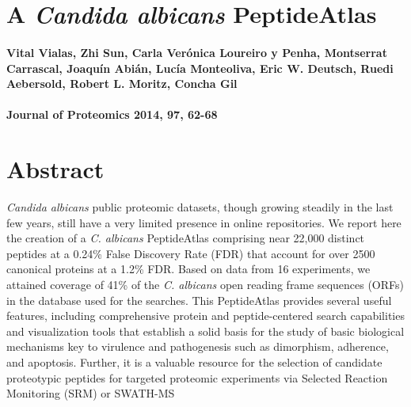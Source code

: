 %
%


\chapter*{A \textit{\textit{Candida albicans}} PeptideAtlas}


\renewcommand{\headrulewidth}{0pt}

\subsubsection*{Vital Vialas, Zhi Sun, Carla Ver\'onica Loureiro y Penha, Montserrat Carrascal, Joaqu\'in Abi\'an, Luc\'ia Monteoliva, Eric W. Deutsch, Ruedi Aebersold, Robert L. Moritz, Concha Gil}
\subsubsection*{Journal of Proteomics 2014, 97, 62-68}

\newpage


%
%



\chapter*{Abstract}
\textit{Candida albicans} public proteomic datasets, though growing
 steadily in the last few years, still have a very limited presence in
 online repositories. We report here the creation of a \textit{C. albicans} PeptideAtlas
 comprising near 22,000 distinct peptides at a 0.24\% False Discovery
 Rate (FDR) that account for over 2500 canonical proteins at a 1.2\% FDR.
 Based on data from 16 experiments, we attained coverage of 41\% of the 
 \textit{C. albicans} open reading frame sequences (ORFs) in the database used 
 for the searches. This PeptideAtlas provides several useful features, 
 including comprehensive protein and peptide-centered search 
 capabilities and visualization tools that establish a solid basis for 
 the study of basic biological mechanisms key to virulence and 
 pathogenesis such as dimorphism, adherence, and apoptosis. 
 Further, it is a valuable resource for the selection of candidate 
 proteotypic peptides for targeted proteomic experiments via Selected
 Reaction Monitoring (SRM) or SWATH-MS

